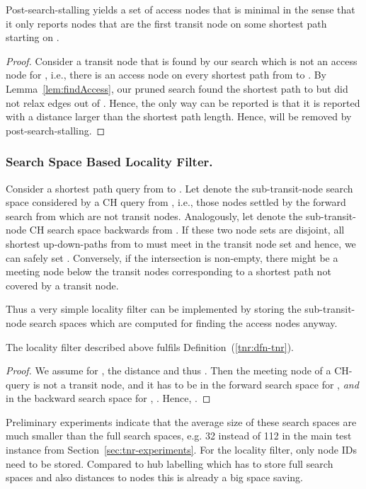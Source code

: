 \documentclass{llncs}
\begin{document}
\begin{lemma}\label{lem:minimality}
Post-search-stalling yields a set of access nodes that is minimal in the sense that it only reports nodes that are the first transit node on some shortest path starting on .
\begin{proof}
Consider a transit node  that is found by our search which is not an access node for , i.e., there is an access node  on every shortest path from  to . 
By Lemma~\ref{lem:findAccess}, our pruned search found the shortest path to  but did not relax edges out of .
Hence, the only way  can be reported is that it is reported with a distance larger than the shortest path length.
Hence,  will be removed by post-search-stalling.
\end{proof}
\end{lemma}

\subsubsection{Search Space Based Locality Filter.}
Consider a shortest path query from  to .  Let  denote the sub-transit-node search space considered by a CH query from , i.e., those nodes  settled by the forward search from  which are not transit nodes. Analogously, let  denote the sub-transit-node CH search space backwards from . If these two node sets are disjoint, all shortest up-down-paths from  to  must meet in the transit node set and hence, we can safely set . Conversely, if the intersection is non-empty, there might be a meeting node below the transit nodes corresponding to a shortest path not covered by a transit node. 

Thus a very simple locality filter can be implemented by storing the sub-transit-node search spaces which are computed for finding the access nodes anyway. 
\begin{lemma}\label{lem:searchspace}
The locality filter described above fulfils Definition~(\ref{tnr:dfn-tnr}).
\begin{proof}
We assume for , the distance  and thus . Then the meeting node  of a CH-query is not a transit node, and it has to be in the forward search space for ,  \emph{and} in the backward search space for , . 
Hence, .
\end{proof}
\end{lemma}
Preliminary experiments indicate that the average size of these search spaces are much smaller than the full search spaces, e.g. 32 instead of 112 in the main test instance from Section~\ref{sec:tnr-experiments}.  For the locality filter, only node IDs need to be stored. Compared to hub labelling which has to store full search spaces and also distances to nodes this is already a big space saving. 
\end{document}
